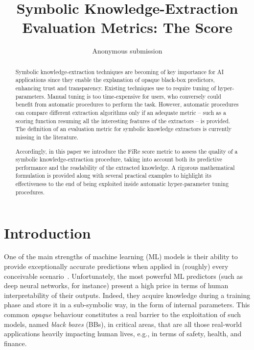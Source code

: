 \documentclass{article}
\title{Symbolic Knowledge-Extraction Evaluation Metrics: The \fire{} Score}
\author{
    Anonymous submission
}
\newcommand{\fire}{FiRe}
\begin{document}
\maketitle

\begin{abstract}
Symbolic knowledge-extraction techniques are becoming of key importance for AI applications since they enable the explanation of opaque black-box predictors, enhancing trust and transparency.
%
Existing techniques use to require tuning of hyper-parameters. Manual tuning is too time-expensive for users, who conversely could benefit from automatic procedures to perform the task.
%
However, automatic procedures can compare different extraction algorithms only if an adequate metric -- such as a scoring function resuming all the interesting features of the extractors -- is provided.
%
The definition of an evaluation metric for symbolic knowledge extractors is currently missing in the literature.

Accordingly, in this paper we introduce the \fire{} score metric to assess the quality of a symbolic knowledge-extraction procedure, taking into account both its predictive performance and the readability of the extracted knowledge.
%
A rigorous mathematical formulation is provided along with several practical examples to highlight its effectiveness to the end of being exploited inside automatic hyper-parameter tuning procedures.

\end{abstract}

\section{Introduction}
One of the main strengths of machine learning (ML) models is their ability to provide exceptionally accurate predictions when applied in (roughly) every conceivable scenario~\cite{rocha2012far}.
%
Unfortunately, the most powerful ML predictors (such as deep neural networks, for instance) present a high price in terms of human interpretability of their outputs.
%
Indeed, they acquire knowledge during a training phase and store it in a sub-symbolic way, in the form of internal parameters.
%
This common \emph{opaque} behaviour constitutes a real barrier to the exploitation of such models, named \emph{black boxes} (BBs), in critical areas, that are all those real-world applications heavily impacting human lives, e.g., in terms of safety, health, and finance.
\end{document}
